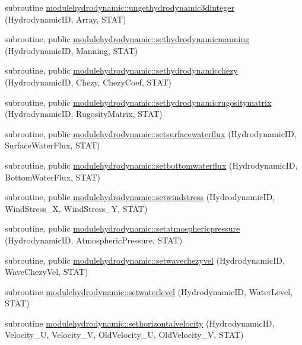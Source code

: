\begin{DoxyCompactItemize}
subroutine \mbox{\hyperlink{namespacemodulehydrodynamic_aeb1abec5f84ff629b6a72c2c9955c7af}{modulehydrodynamic\+::ungethydrodynamic3dinteger}} (Hydrodynamic\+ID, Array, S\+T\+AT)
\item 
subroutine, public \mbox{\hyperlink{namespacemodulehydrodynamic_afcbe369a4cc8b78bc18a290f3e05a412}{modulehydrodynamic\+::sethydrodynamicmanning}} (Hydrodynamic\+ID, Manning, S\+T\+AT)
\item 
subroutine, public \mbox{\hyperlink{namespacemodulehydrodynamic_aa753ccba1fb48238465631f89ecd8cb6}{modulehydrodynamic\+::sethydrodynamicchezy}} (Hydrodynamic\+ID, Chezy, Chezy\+Coef, S\+T\+AT)
\item 
subroutine, public \mbox{\hyperlink{namespacemodulehydrodynamic_abf6161f88fc2f65b07d9f8764a501633}{modulehydrodynamic\+::sethydrodynamicrugositymatrix}} (Hydrodynamic\+ID, Rugosity\+Matrix, S\+T\+AT)
\item 
subroutine, public \mbox{\hyperlink{namespacemodulehydrodynamic_a9f134631e27c5fcbe9d6185409149bb5}{modulehydrodynamic\+::setsurfacewaterflux}} (Hydrodynamic\+ID, Surface\+Water\+Flux, S\+T\+AT)
\item 
subroutine, public \mbox{\hyperlink{namespacemodulehydrodynamic_ab2050ec05277d36366cce71907994973}{modulehydrodynamic\+::setbottomwaterflux}} (Hydrodynamic\+ID, Bottom\+Water\+Flux, S\+T\+AT)
\item 
subroutine, public \mbox{\hyperlink{namespacemodulehydrodynamic_a9286159a46a146fe7713e10cda0bf636}{modulehydrodynamic\+::setwindstress}} (Hydrodynamic\+ID, Wind\+Stress\+\_\+X, Wind\+Stress\+\_\+Y, S\+T\+AT)
\item 
subroutine, public \mbox{\hyperlink{namespacemodulehydrodynamic_ab767a1bf58d41f86c6b2ab58684d962d}{modulehydrodynamic\+::setatmosphericpressure}} (Hydrodynamic\+ID, Atmospheric\+Pressure, S\+T\+AT)
\item 
subroutine, public \mbox{\hyperlink{namespacemodulehydrodynamic_ad7a33c322002783aeb2b7b50ed690a4b}{modulehydrodynamic\+::setwavechezyvel}} (Hydrodynamic\+ID, Wave\+Chezy\+Vel, S\+T\+AT)
\item 
subroutine \mbox{\hyperlink{namespacemodulehydrodynamic_ac429c4fc2329d56d285f5389d5d57e55}{modulehydrodynamic\+::setwaterlevel}} (Hydrodynamic\+ID, Water\+Level, S\+T\+AT)
\item 
subroutine \mbox{\hyperlink{namespacemodulehydrodynamic_a57dc7c696d4679f3a6d7f8f297145b63}{modulehydrodynamic\+::sethorizontalvelocity}} (Hydrodynamic\+ID, Velocity\+\_\+U, Velocity\+\_\+V, Old\+Velocity\+\_\+U, Old\+Velocity\+\_\+V, S\+T\+AT)

\end{DoxyCompactItemize}
